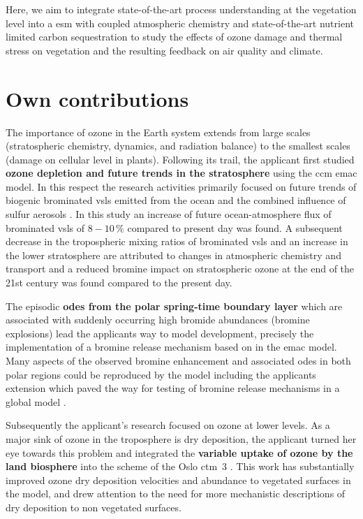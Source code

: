 Here, we aim to integrate state-of-the-art process understanding at the vegetation level into a \gls{esm} with coupled atmospheric chemistry and state-of-the-art nutrient limited carbon sequestration to study the effects of ozone damage and thermal stress on vegetation and the resulting feedback on air quality and climate.

\section{Own contributions}
\label{sec:contrib}
The importance of ozone in the Earth system extends from large scales (stratospheric chemistry, dynamics, and radiation balance) to the smallest scales (damage on cellular level in plants). Following its trail, the applicant first studied \textbf{ozone depletion and future trends in the stratosphere} using the \gls{ccm} \gls{emac} model. In this respect the research activities primarily focused on future trends of biogenic brominated \gls{vsls} emitted from the ocean and the combined influence of sulfur aerosols \parencite{ACP:Falk2017}. In this study an increase of future ocean-atmosphere flux of brominated \gls{vsls} of $8-10\,\%$ compared to present day was found. A subsequent decrease in the tropospheric mixing ratios of brominated \gls{vsls} and an increase in the lower stratosphere are attributed to changes in atmospheric chemistry and transport and a reduced bromine impact on stratospheric ozone at the end of the 21st century was found compared to the present day.

The episodic \textbf{\glspl{ode} from the polar spring-time boundary layer} which are associated with suddenly occurring high bromide abundances (bromine explosions) lead the applicants way to model development, precisely the implementation of a bromine release mechanism based on \textcite{ACP:Toyota2011} in the \gls{emac} model. Many aspects of the observed bromine enhancement and associated \glspl{ode} in both polar regions could be reproduced by the model including the applicants extension which paved the way for testing of bromine release mechanisms in a global model \parencite{GMD:Falk2018}.

Subsequently the applicant’s research focused on ozone at lower levels. As a  major sink of ozone in the troposphere is dry deposition, the applicant turned her eye towards this problem and integrated the \textbf{variable uptake of ozone by the land biosphere} into the scheme of the Oslo \gls{ctm}~3 \parencite{GMD:Falk2019}. This work has substantially improved ozone dry deposition velocities and abundance to vegetated surfaces in the model, and drew attention to the need for more mechanistic descriptions of dry deposition to non vegetated surfaces.

